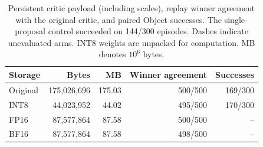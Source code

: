 \begin{table}[tb]
\centering\small
\caption{Persistent critic payload (including scales), replay winner agreement with the original critic, and paired Object successes. The single-proposal control succeeded on 144/300 episodes. Dashes indicate unevaluated arms. INT8 weights are unpacked for computation. MB denotes $10^6$ bytes.}
\label{tab:precision}
\begin{tabular}{@{}lrrrr@{}}
\toprule
Storage & Bytes & MB & Winner agreement & Successes \\
\midrule
Original & 175,026,696 & 175.03 & 500/500 & 169/300 \\
INT8 & 44,023,952 & 44.02 & 495/500 & 170/300 \\
FP16 & 87,577,864 & 87.58 & 500/500 & -- \\
BF16 & 87,577,864 & 87.58 & 498/500 & -- \\
\bottomrule
\end{tabular}
\end{table}
